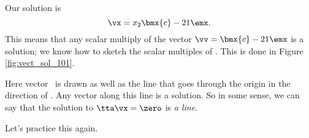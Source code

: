 {Our solution is 
\[
\vx = x_2\bmx{c}-2\\1\emx.
\]
This means that any scalar multiply of the vector $\vv = \bmx{c} -2\\1\emx$ is a solution; we know how to sketch the scalar multiples of \vv. This is done in Figure \ref{fig:vect_sol_101}. 

\begin{myfigure}%
\begin{center}
\end{center}
\label{fig:vect_sol_101}
\end{myfigure}

Here vector \vv\ is drawn as well as the line that goes through the origin in the direction of \vv. Any vector along this line is a solution. So in some sense, we can say that the solution to $\tta\vx=\zero$ is \textit{a line}. 
}

\medskip

Let's practice this again. 

\medskip

